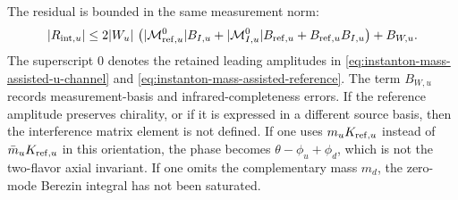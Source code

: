 \begin{controlledapproximation}
The residual is bounded in the same measurement norm:
\begin{equation}
  |R_{{\rm int},u}|
  \le
  2|W_u|\,
  \left(
    |\mathcal M_{{\rm ref},u}^{0}|B_{I,u}
    +|\mathcal M_{I,u}^{0}|B_{{\rm ref},u}
    +B_{{\rm ref},u}B_{I,u}
  \right)
  +B_{W,u}.
  \label{eq:instanton-mass-assisted-interference-bound}
\end{equation}
The superscript \(0\) denotes the retained leading amplitudes in
\eqref{eq:instanton-mass-assisted-u-channel} and
\eqref{eq:instanton-mass-assisted-reference}.  The term \(B_{W,u}\) records
measurement-basis and infrared-completeness errors.  If the reference
amplitude preserves chirality, or if it is expressed in a different source
basis, then the interference matrix element is not defined.  If one uses
\(m_uK_{{\rm ref},u}\) instead of \(\bar m_uK_{{\rm ref},u}\) in this
orientation, the phase becomes \(\theta-\phi_u+\phi_d\), which is not the
two-flavor axial invariant.  If one omits the complementary mass \(m_d\), the
zero-mode Berezin integral has not been saturated.
\end{controlledapproximation}

